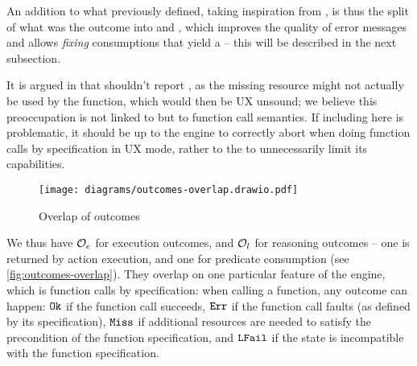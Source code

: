 An addition to what \cite{cse2} previously defined, taking inspiration from \cite{sacha-phd}, is thus the split of what was the  outcome into \LFail{} and \Miss{}, which improves the quality of error messages and allows \emph{fixing} consumptions that yield a \Miss{} -- this will be described in the next subsection.

\begin{remark}
	It is argued in \cite{cse1} that \consume{} shouldn't report \Miss, as the missing resource might not actually be used by the function, which would then be UX unsound; we believe this preoccupation is not linked to \consume{} but to function call semantics. If including \Miss{} here is problematic, it should be up to the engine to correctly abort when doing function calls by specification in UX mode, rather to the \consume{} to unnecessarily limit its capabilities.
\end{remark}

\begin{figure}
	\centering
	\texttt{[image: diagrams/outcomes-overlap.drawio.pdf]}
	\caption{Overlap of outcomes}
	\label{fig:outcomes-overlap}
\end{figure}

We thus have ${\cal O}_e$ for execution outcomes, and ${\cal O}_l$ for reasoning outcomes -- one is returned by action execution, and one for predicate consumption (see \autoref{fig:outcomes-overlap}). They overlap on one particular feature of the engine, which is function calls by specification: when calling a function, any outcome can happen: $\texttt{Ok}$ if the function call succeeds, $\texttt{Err}$ if the function call faults (as defined by its specification), $\texttt{Miss}$ if additional resources are needed to satisfy the precondition of the function specification, and $\texttt{LFail}$ if the state is incompatible with the function specification.

